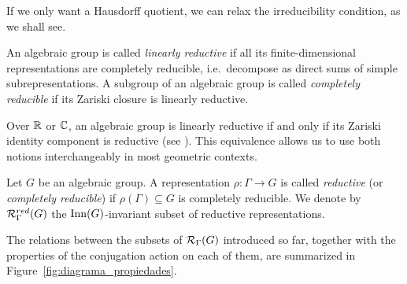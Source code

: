 If we only want a Hausdorff quotient, we can relax the irreducibility condition, as we shall see.

\begin{definition}
    An algebraic group is called \emph{linearly reductive} if all its finite-dimensional representations are completely reducible, i.e.\ decompose as direct sums of simple subrepresentations. A subgroup of an algebraic group is called \emph{completely reducible} if its Zariski closure is linearly reductive.
\end{definition}

Over $\mathbb{R}$ or $\mathbb{C}$, an algebraic group is linearly reductive if and only if its Zariski identity component is reductive (see \cite[Cor.~22.43]{milneAlgebraicGroupsTheory2017}). This equivalence allows us to use both notions interchangeably in most geometric contexts.

\begin{definition}
    Let $G$ be an algebraic group. A representation $\rho : \Gamma \to G$ is called \emph{reductive} (or \emph{completely reducible}) if $\rho(\Gamma) \subseteq G$ is completely reducible. We denote by $\RepVar{\Gamma}{G}[red]$ the $\operatorname{Inn}(G)$-invariant subset of reductive representations.
\end{definition}

The relations between the subsets of $\RepVar{\Gamma}{G}$ introduced so far, together with the properties of the conjugation action on each of them, are summarized in Figure~\ref{fig:diagrama_propiedades}.

